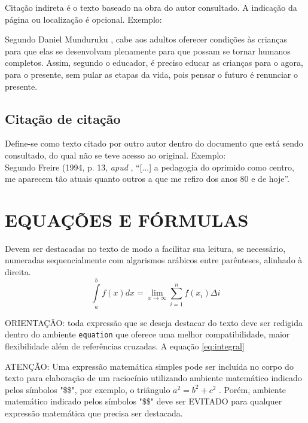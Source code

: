 \documentclass[
  12pt,		%
  a4paper,	%
  openright,  %
  oneside,	%
  chapter=TITLE,		%
  section=TITLE,		%
  english,	%
  french,	    %
  spanish,	%
  brazil	    %
]{abntex2}
\begin{document}
        Citação indireta é o texto baseado na obra do autor consultado. A indicação da página ou localização é opcional. Exemplo:
        
        Segundo Daniel Munduruku \cite{aruju}, cabe aos adultos oferecer condições às crianças para que elas se desenvolvam plenamente para que possam se tornar humanos completos. Assim, segundo o educador, é preciso educar as crianças para o agora, para o presente, sem pular as etapas da vida, pois pensar o futuro é renunciar o presente.

    \subsection{Citação de citação}	

        Define-se como texto citado por outro autor dentro do documento que está sendo consultado, do qual não se teve acesso ao original. Exemplo:
        \\
        Segundo Freire (1994, p. 13, \textit{apud} \cite[p.17]{streck}, “[...] a pedagogia do oprimido como centro, me aparecem tão atuais quanto outros a que me refiro dos anos 80 e de hoje”.
      
    
    
    \section{EQUAÇÕES E FÓRMULAS}
        
        Devem ser destacadas no texto de modo a facilitar sua leitura, se necessário, numeradas sequencialmente com algarismos arábicos entre parênteses, alinhado à direita. 
          \begin{equation}
            \label{eq:integral}
            \int\limits_a^b f(x) dx = \lim_{x \to \infty} \displaystyle\sum_{i=1}^{n} f(x_i) \Delta i
        \end{equation}        
     
      ORIENTAÇÃO: toda expressão que se deseja destacar do texto deve ser redigida dentro do ambiente \verb|equation| que oferece uma melhor compatibilidade, maior flexibilidade além de referências cruzadas. A equação \ref{eq:integral}  
        
    ATENÇÃO: Uma expressão matemática simples pode ser incluída no corpo do texto para elaboração de um raciocínio utilizando  ambiente matemático indicado pelos símbolos "\$\$", por exemplo,  o triângulo $a^2 = b^2 + c^2$ . Porém,  ambiente matemático indicado pelos símbolos "\$\$" deve ser EVITADO para qualquer expressão matemática que precisa ser destacada.
                  
\end{document}
